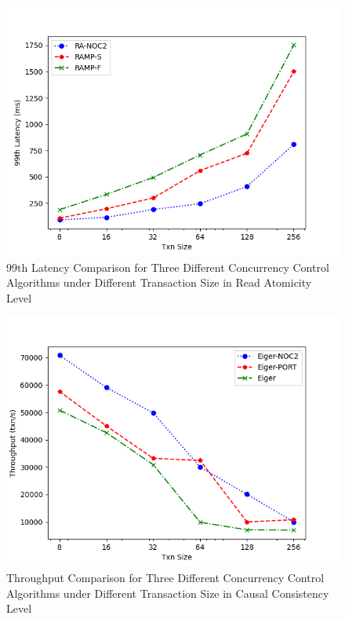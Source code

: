 \begin{figure}
    \centering
    \includegraphics[width=0.8\linewidth]{figure/1-ra-l.png}
    \caption{99th Latency Comparison for Three Different Concurrency Control Algorithms under Different Transaction Size in Read Atomicity Level}
    \label{fig:3}
\end{figure}


\begin{figure}
    \centering
    \includegraphics[width=0.8\linewidth]{figure/1-tcc-t.png}
    \caption{Throughput Comparison for Three Different Concurrency Control Algorithms under Different Transaction Size in Causal Consistency Level}
    \label{fig:4}
\end{figure}


